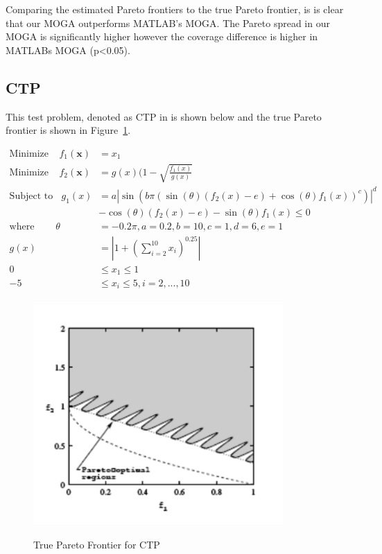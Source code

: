 \documentclass{article}
\begin{document}
\noindent Comparing the estimated Pareto frontiers to the true Pareto frontier, is is clear that our MOGA outperforms MATLAB's MOGA. The Pareto spread in our MOGA is significantly higher however the coverage difference is higher in MATLABs MOGA (p<0.05).
\newpage
\subsection{CTP} 
This test problem, denoted as CTP in \cite{deb2001multi} is shown below and the true Pareto frontier is shown in Figure~\ref{fig:CTP_true}. 


\begin{align*}
\textrm{Minimize} ~~~~~ f_1(\textbf{x}) &= x_1 \\
\textrm{Minimize} ~~~~~ f_2(\textbf{x}) &= g(x)(1-\sqrt{\frac{f_1(x)}{g(x)}} \\
\textrm{Subject to} ~~~~ g_1(x) &= a|\sin(b\pi(\sin(\theta)(f_2(x)-e)+\cos(\theta)f_1(x))^c)|^d \\
&- \cos(\theta)(f_2(x)-e)-\sin(\theta)f_1(x) \leq 0 \\
\textrm{where} ~~~~~~~~~~ \theta &= -0.2\pi, a = 0.2, b=10, c=1, d=6, e = 1 \\
g(x) &= |1+(\sum_{i=2}^{10}x_i)^{0.25}| \\
0 &\leq  x_1  \leq 1 \\
-5 &\leq  x_i  \leq 5, i = 2,...,10 \\
\end{align*}
\begin{figure}[H]
  \caption{True Pareto Frontier for CTP}
  \centering
  \includegraphics[width=0.85\textwidth]{CTP_pareto_true.png}  
  \label{fig:CTP_true}
\end{figure}
\end{document}
